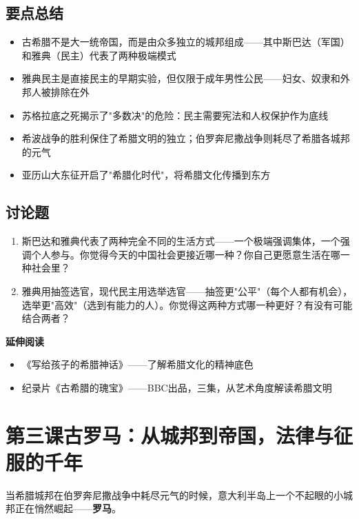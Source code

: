 \documentclass[a4paper,12pt]{ctexart}
\begin{document}
\subsection*{要点总结}
\begin{itemize}
  \item 古希腊不是大一统帝国，而是由众多独立的城邦组成——其中斯巴达（军国）和雅典（民主）代表了两种极端模式
  \item 雅典民主是直接民主的早期实验，但仅限于成年男性公民——妇女、奴隶和外邦人被排除在外
  \item 苏格拉底之死揭示了"多数决"的危险：民主需要宪法和人权保护作为底线
  \item 希波战争的胜利保住了希腊文明的独立；伯罗奔尼撒战争则耗尽了希腊各城邦的元气
  \item 亚历山大东征开启了"希腊化时代"，将希腊文化传播到东方
\end{itemize}

\subsection*{讨论题}
\begin{enumerate}
  \item 斯巴达和雅典代表了两种完全不同的生活方式——一个极端强调集体，一个强调个人参与。你觉得今天的中国社会更接近哪一种？你自己更愿意生活在哪一种社会里？
  \item 雅典用抽签选官，现代民主用选举选官——抽签更"公平"（每个人都有机会），选举更"高效"（选到有能力的人）。你觉得这两种方式哪一种更好？有没有可能结合两者？
\end{enumerate}

\vspace{0.3cm}
\textcolor{blue!70!black}{\textbf{延伸阅读}}
\begin{itemize}
  \item 《写给孩子的希腊神话》——了解希腊文化的精神底色
  \item 纪录片《古希腊的瑰宝》——BBC出品，三集，从艺术角度解读希腊文明
\end{itemize}

\newpage

\section{\textcolor{orange!80!black}{第三课\quad 古罗马：从城邦到帝国，法律与征服的千年}}

当希腊城邦在伯罗奔尼撒战争中耗尽元气的时候，意大利半岛上一个不起眼的小城邦正在悄然崛起——\textbf{罗马}。
\end{document}
